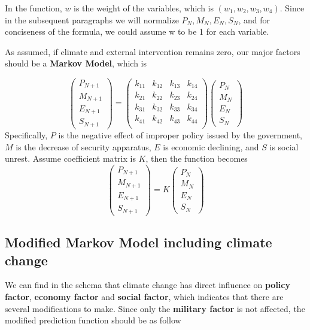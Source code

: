 \documentclass{mcmthesis}
\begin{document}
	In the function, $w$ is the weight of the variables, which is $(w_1, w_2, w_3, w_4)$. Since in the subsequent paragraphs we will normalize $P_N, M_N, E_N, S_N$, and for conciseness of the formula, we could assume w to be 1 for each variable.
	
	As assumed, if climate and external intervention remains zero, our major factors should be a \textbf{Markov Model}, which is
	
	$$
	\left(
	\begin{matrix}
	P_{N+1} \\ M_{N+1} \\ E_{N+1} \\ S_{N+1}
	\end{matrix}
	\right) 
	= 
	\left(
	\begin{matrix}
	k_{11} & k_{12} & k_{13} & k_{14} \\
	k_{21} & k_{22} & k_{23} & k_{24} \\
	k_{31} & k_{32} & k_{33} & k_{34} \\
	k_{41} & k_{42} & k_{43} & k_{44} \\
	\end{matrix}
	\right) 
	\left(
	\begin{matrix}
	P_N \\ M_N \\ E_N \\ S_N
	\end{matrix}
	\right) 
	$$
	Specifically, $P$ is the negative effect of improper policy issued by the government, $M$ is the decrease of security apparatus, $E$ is economic declining, and $S$ is social unrest. Assume coefficient matrix is $K$, then the function becomes
	$$
	\left(
	\begin{matrix}
	P_{N+1} \\ M_{N+1} \\ E_{N+1} \\ S_{N+1}
	\end{matrix}
	\right) 
	= 
	K
	\left(
	\begin{matrix}
	P_N \\ M_N \\ E_N \\ S_N
	\end{matrix}
	\right) 
	$$
	
	\subsection{Modified Markov Model including climate change}
	
	We can find in the schema that climate change has direct influence on \textbf{policy factor}, \textbf{economy factor} and \textbf{social factor}, which indicates that there are several modifications to make. Since only the \textbf{military factor} is not affected, the modified prediction function should be as follow
	
\end{document}

